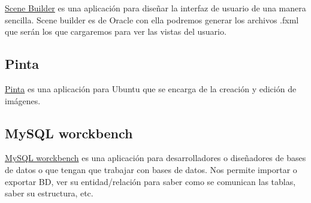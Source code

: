\href{http://www.oracle.com/technetwork/java/javase/downloads/javafxscenebuilder-info-2157684.html}{Scene Builder} es una aplicación para diseñar la interfaz de usuario de una manera sencilla. Scene builder es de Oracle con ella podremos generar los archivos .fxml que serán los que cargaremos para ver las vistas del usuario.

\subsection{Pinta}\label{pinta}

\href{https://pinta-project.com/pintaproject/pinta/}{Pinta} es una aplicación para Ubuntu que se encarga de la creación y edición de imágenes.

\subsection{MySQL worckbench}\label{pinta}

\href{https://pinta-project.com/pintaproject/pinta/}{MySQL worckbench} es una aplicación para desarrolladores o diseñadores de bases de datos o que tengan que trabajar con bases de datos. Nos permite importar o exportar BD, ver su entidad/relación para saber como se comunican las tablas, saber su estructura, etc. \cite{web:worckbench}
